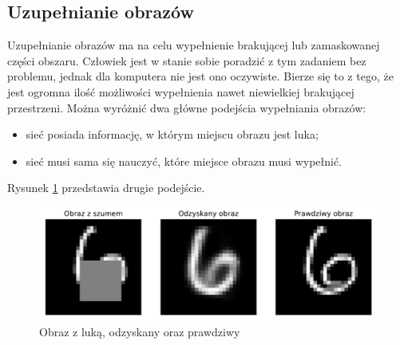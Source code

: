 \documentclass[a4paper,12pt,oneside]{book} %
\begin{document}
\subsection{Uzupełnianie obrazów}
Uzupełnianie obrazów ma na celu wypełnienie brakującej lub zamaskowanej części obszaru. Człowiek jest w stanie sobie poradzić z tym zadaniem bez problemu, jednak dla komputera nie jest ono oczywiste. Bierze się to z tego, że jest ogromna ilość możliwości wypełnienia nawet niewielkiej brakującej przestrzeni. 
Można wyróżnić dwa główne podejścia wypełniania obrazów:
\begin{itemize}
	\item sieć posiada informację, w którym miejscu obrazu jest luka;
	\item sieć musi sama się nauczyć, które miejsce obrazu musi wypełnić.
\end{itemize}
Rysunek \ref{fig:lukaae} przedstawia drugie podejście. 
\begin{figure}[h]
	\centering\includegraphics[width=14.5cm]{completionae.pdf}
	\caption{Obraz z luką, odzyskany oraz prawdziwy}
	\label{fig:lukaae}
\end{figure}
\end{document}
